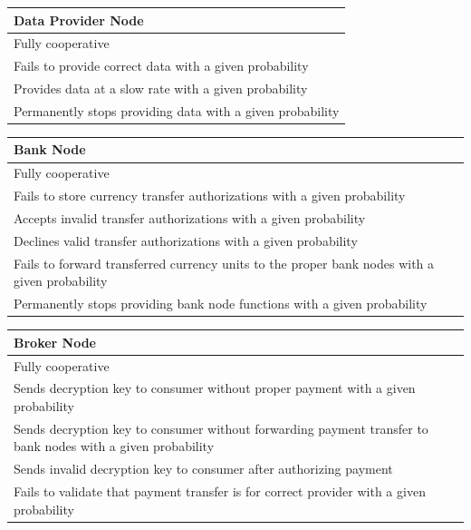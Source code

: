 \documentclass[%
				10pt,
        final,
        notitlepage,
        narroweqnarray,
        inline,
        twoside,
        ]{ieee}
\begin{document}
\begin{center}
  \begin{tabular}{ p{6.25cm} }
    \bf Data Provider Node \\ \hline
    \hline
    Fully cooperative \\ \hline
    Fails to provide correct data with a given probability \\ \hline
    Provides data at a slow rate with a given probability \\ \hline
    Permanently stops providing data with a given probability \\ \hline
  \end{tabular}
\end{center}

\begin{center}
  \begin{tabular}{ p{6.25cm} }
    \bf Bank Node \\ \hline
    \hline
    Fully cooperative \\ \hline
    Fails to store currency transfer authorizations with a given probability \\ \hline
    Accepts invalid transfer authorizations with a given probability \\ \hline
    Declines valid transfer authorizations with a given probability \\ \hline
    Fails to forward transferred currency units to the proper bank nodes with a given probability \\ \hline
    Permanently stops providing bank node functions with a given probability \\ \hline
  \end{tabular}
\end{center}

\begin{center}
  \begin{tabular}{ p{6.25cm} }
    \bf Broker Node \\ \hline
    \hline
    Fully cooperative \\ \hline
    Sends decryption key to consumer without proper payment with a given probability \\ \hline
    Sends decryption key to consumer without forwarding payment transfer to bank nodes with a given probability \\ \hline
    Sends invalid decryption key to consumer after authorizing payment \\ \hline
    Fails to validate that payment transfer is for correct provider with a given probability \\ \hline
  \end{tabular}
\end{center}
\end{document}
